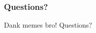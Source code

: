 


\begin{frame}
  \titlepage
\end{frame}











\begin{frame}
\frametitle{Questions?}
Dank memes bro!
\centering
\vspace{0.3\textheight}
Questions?
\end{frame}


 